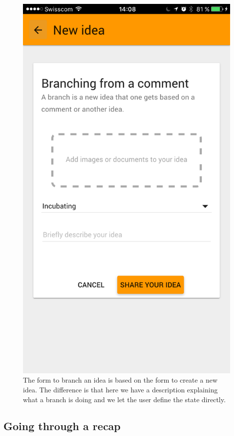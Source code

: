 \documentclass[a4paper,12pt,twoside]{article}
\begin{document}
\begin{figure}[!htb]
\begin{minipage}[t]{.32\textwidth}
        \includegraphics[width=\textwidth]{images/flow_branch_2.png}
        \caption{The form to branch an idea is based on the form to create a new idea. The difference is that here we have a description explaining what a branch is doing and we let the user define the state directly.}
    \end{minipage}
\end{figure}

\clearpage
\subsection{Going through a recap}
\end{document}
